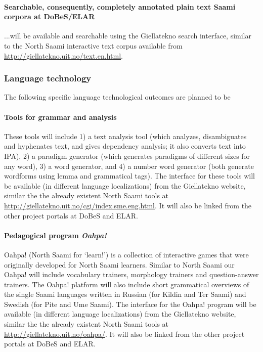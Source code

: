 \documentclass[a4paper,12pt]{article}
\begin{document}
\paragraph{Searchable, consequently, completely annotated plain text Saami corpora at DoBeS/ELAR}
...will be available and searchable using the Giellatekno search interface, similar to the North Saami interactive text corpus available from \url{http://giellatekno.uit.no/text.en.html}.

\subsubsection{Language technology}
The following specific language technological outcomes are planned to be %
\paragraph{Tools for grammar and analysis}
These tools will include 1) a text analysis tool (which analyzes, disambiguates and hyphenates text, and gives dependency analysis; it also converts text into IPA), 2) a paradigm generator (which generates paradigms of different sizes for any word), 3) a word generator, and 4) a number word generator (both generate wordforms using lemma and grammatical tags). The interface for these tools will be available (in different language localizations) from the Giellatekno website, similar the the already existent North Saami tools at \url{http://giellatekno.uit.no/cgi/index.sme.eng.html}. It will also be linked from the other project portals at DoBeS and ELAR.

\paragraph{Pedagogical program \textit{Oahpa!}}
Oahpa! (North Saami for ‘learn!’) is a collection of interactive games that were originally developed for North Saami learners. Similar to North Saami our Oahpa! will include vocabulary trainers, morphology trainers and question-answer trainers. The Oahpa! platform will also include short grammatical overviews of the single Saami languages written in Russian (for Kildin and Ter Saami) and Swedish (for Pite and Ume Saami). The interface for the Oahpa! program will be available (in different language localizations) from the Giellatekno website, similar the the already existent North Saami tools at \url{http://giellatekno.uit.no/oahpa/}. It will also be linked from the other project portals at DoBeS and ELAR.
\end{document}
